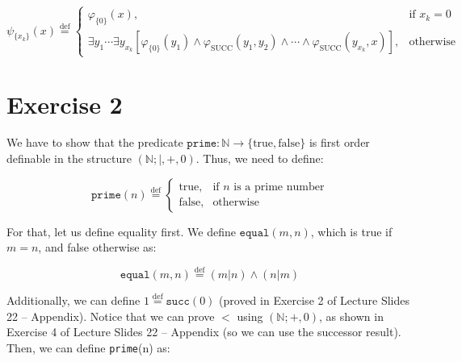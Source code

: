 \documentclass[11pt]{article}
\begin{document}
\begin{equation*}
    \psi_{\{x_k\}}(x) \stackrel{\text{def}}{=} 
    \begin{cases}
        \varphi_{\{0\}}(x), & \text{if } x_k = 0 \\
        \exists {y_1} \cdots \exists {y_{x_k}} \left[ \varphi_{\{0\}}(y_1) \land \varphi_{\scriptscriptstyle\text{SUCC}}(y_1, y_2) \land \cdots \land \varphi_{\scriptscriptstyle\text{SUCC}}(y_{x_k}, x)\right], & \text{otherwise}
    \end{cases}
\end{equation*}




\section*{Exercise 2}

We have to show that the predicate $\texttt{prime}: \mathbb{N} \to \{\text{true}, \text{false}\}$ is first order definable in the structure $(\mathbb{N}; |, +, 0)$. Thus, we need to define:

\begin{equation*}
    \texttt{prime}(n) \stackrel{\text{def}}{=} 
    \begin{cases}
        \text{true,} & \text{if } n \text{ is a prime number} \\
        \text{false,} & \text{otherwise}
    \end{cases}
\end{equation*}

For that, let us define equality first. We define $\texttt{equal}(m, n)$, which is true if $m = n$, and false otherwise as:

$$\texttt{equal}(m, n) \stackrel{\text{def}}{=} (m | n) \land (n | m)$$

Additionally, we can define $1 \stackrel{\text{def}}{=} \texttt{succ}(0)$ (proved in Exercise 2 of Lecture Slides 22 -- Appendix). Notice that we can prove $<$ using $(\mathbb{N}; +, 0)$, as shown in Exercise 4 of  Lecture Slides 22 -- Appendix (so we can use the successor result). Then, we can define \texttt{prime}(n) as:
\end{document}
